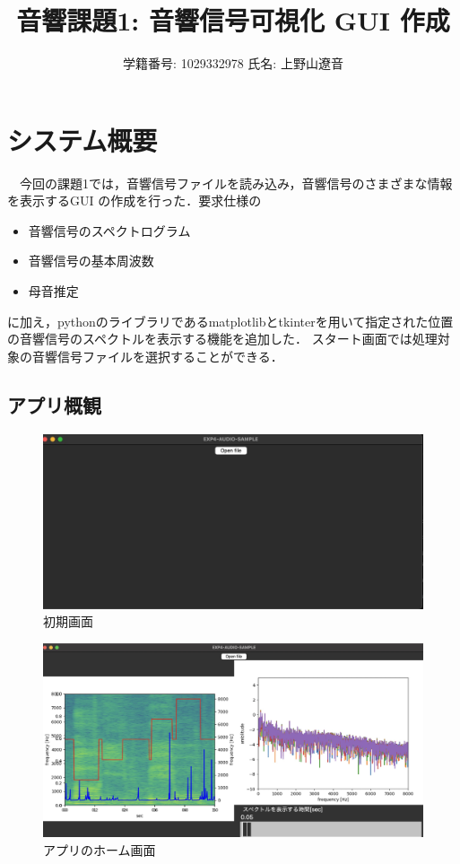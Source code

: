 \documentclass[11pt,a4j]{jarticle}%
\begin{document}
\title{\textbf{音響課題1: 音響信号可視化 GUI 作成}}
\author{学籍番号: 1029332978 氏名: 上野山遼音}
\maketitle
\tableofcontents
\clearpage
\section{システム概要}
　今回の課題1では，音響信号ファイルを読み込み，音響信号のさまざまな情報を表示するGUI
の作成を行った．要求仕様の
\begin{itemize}
  \item 音響信号のスペクトログラム
  \item 音響信号の基本周波数
  \item 母音推定
\end{itemize}
に加え，pythonのライブラリであるmatplotlibとtkinterを用いて指定された位置の音響信号のスペクトルを表示する機能を追加した．
スタート画面では処理対象の音響信号ファイルを選択することができる．
\subsection*{アプリ概観}
\begin{figure}[H]
  \centering
  \includegraphics[width=120mm]{img/init.jpg}
  \caption{初期画面}
\end{figure}
\begin{figure}[H]
  \centering
  \includegraphics[width=120mm]{img/app2.jpg}
  \caption{アプリのホーム画面}
\end{figure}
\clearpage
\end{document}

